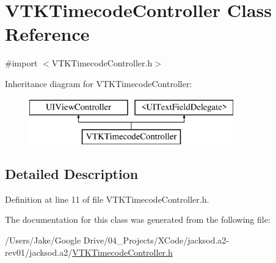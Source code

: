 \hypertarget{interface_v_t_k_timecode_controller}{\section{V\+T\+K\+Timecode\+Controller Class Reference}
\label{interface_v_t_k_timecode_controller}
}


{\ttfamily \#import $<$V\+T\+K\+Timecode\+Controller.\+h$>$}

Inheritance diagram for V\+T\+K\+Timecode\+Controller\+:\begin{figure}[H]
\begin{center}
\leavevmode
\includegraphics[height=2.000000cm]{interface_v_t_k_timecode_controller}
\end{center}
\end{figure}


\subsection{Detailed Description}


Definition at line 11 of file V\+T\+K\+Timecode\+Controller.\+h.



The documentation for this class was generated from the following file\+:\begin{DoxyCompactItemize}
\item 
/\+Users/\+Jake/\+Google Drive/04\+\_\+\+Projects/\+X\+Code/jacksod.\+a2-\/rev01/jacksod.\+a2/\hyperlink{_v_t_k_timecode_controller_8h}{V\+T\+K\+Timecode\+Controller.\+h}\end{DoxyCompactItemize}
